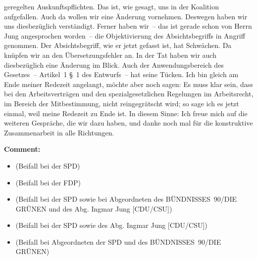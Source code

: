 \documentclass{article}
\begin{document}
geregelten Auskunftspflichten. Das ist, wie gesagt, uns in der Koalition aufgefallen. Auch da wollen wir eine Änderung vornehmen. Deswegen haben wir uns diesbezüglich verständigt. Ferner haben wir – das ist gerade schon von Herrn Jung angesprochen worden – die Objektivierung des Absichtsbegriffs in Angriff genommen. Der Absichtsbegriff, wie er jetzt gefasst ist, hat Schwächen. Da knüpfen wir an den Übersetzungsfehler an. In der Tat haben wir auch diesbezüglich eine Änderung im Blick. Auch der Anwendungsbereich des Gesetzes – Artikel 1 § 1 des Entwurfs – hat seine Tücken. Ich bin gleich am Ende meiner Redezeit angelangt, möchte aber noch sagen: Es muss klar sein, dass bei den Arbeitsverträgen und den spezialgesetzlichen Regelungen im Arbeitsrecht, im Bereich der Mitbestimmung, nicht reingegrätscht wird; so sage ich es jetzt einmal, weil meine Redezeit zu Ende ist.  In diesem Sinne: Ich freue mich auf die weiteren Gespräche, die wir dazu haben, und danke noch mal für die konstruktive Zusammenarbeit in alle Richtungen.  

\noindent\textbf{Comment:}
\begin{itemize}
    \setlength\itemsep{-3pt}
    \item (Beifall bei der SPD)
    \setlength\itemsep{-3pt}
    \item (Beifall bei der FDP)
    \setlength\itemsep{-3pt}
    \item (Beifall bei der SPD sowie bei Abgeordneten des BÜNDNISSES 90/DIE GRÜNEN und des Abg. Ingmar Jung [CDU/CSU])
    \setlength\itemsep{-3pt}
    \item (Beifall bei der SPD sowie des Abg. Ingmar Jung [CDU/CSU])
    \setlength\itemsep{-3pt}
    \item (Beifall bei Abgeordneten der SPD und des BÜNDNISSES 90/DIE GRÜNEN)
\end{itemize}
\end{document}
